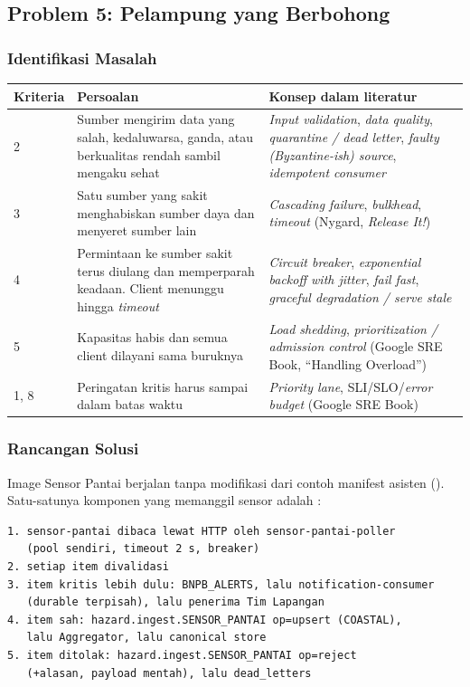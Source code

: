 \subsection{Problem 5: Pelampung yang Berbohong}

\subsubsection{Identifikasi Masalah}

\begin{longtable}{|p{1.6cm}|p{5.6cm}|p{7.7cm}|}
\hline
\textbf{Kriteria} & \textbf{Persoalan} & \textbf{Konsep dalam literatur}\\ \hline \endhead
2 & Sumber mengirim data yang salah, kedaluwarsa, ganda, atau berkualitas rendah sambil mengaku sehat & \textit{Input validation}, \textit{data quality}, \textit{quarantine / dead letter}, \textit{faulty (Byzantine-ish) source}, \textit{idempotent consumer}\\ \hline
3 & Satu sumber yang sakit menghabiskan sumber daya dan menyeret sumber lain & \textit{Cascading failure}, \textit{bulkhead}, \textit{timeout} (Nygard, \textit{Release It!})\\ \hline
4 & Permintaan ke sumber sakit terus diulang dan memperparah keadaan. Client menunggu hingga \textit{timeout} & \textit{Circuit breaker}, \textit{exponential backoff with jitter}, \textit{fail fast}, \textit{graceful degradation / serve stale}\\ \hline
5 & Kapasitas habis dan semua client dilayani sama buruknya & \textit{Load shedding}, \textit{prioritization / admission control} (Google SRE Book, ``Handling Overload'')\\ \hline
1, 8 & Peringatan kritis harus sampai dalam batas waktu & \textit{Priority lane}, SLI/SLO/\textit{error budget} (Google SRE Book)\\ \hline
\end{longtable}

\subsubsection{Rancangan Solusi}

Image Sensor Pantai berjalan tanpa modifikasi dari contoh manifest asisten (). Satu-satunya komponen yang memanggil sensor adalah :

\begin{lstlisting}
1. sensor-pantai dibaca lewat HTTP oleh sensor-pantai-poller
   (pool sendiri, timeout 2 s, breaker)
2. setiap item divalidasi
3. item kritis lebih dulu: BNPB_ALERTS, lalu notification-consumer
   (durable terpisah), lalu penerima Tim Lapangan
4. item sah: hazard.ingest.SENSOR_PANTAI op=upsert (COASTAL),
   lalu Aggregator, lalu canonical store
5. item ditolak: hazard.ingest.SENSOR_PANTAI op=reject
   (+alasan, payload mentah), lalu dead_letters
\end{lstlisting}

